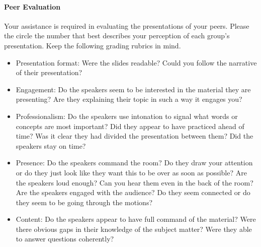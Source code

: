 \documentclass[10pt]{article}
\begin{document}

\newcommand{\grademe}[2]{
\begin{table}[h!]
	\centering
	\begin{tabular}{|l|c|c|c|c|c|p{2.5in}|}
	\hline
	Criteria & Poor & Fair & Average & Good & Excellent & Comments \\
	\hline
	Presentation format 		& 1 & 2 & 3 & 4 & 5 & \\[1.5ex]
	Engagement	& 1 & 2 & 3 & 4 & 5 & \\[1.5ex]
	Professionalism	& 1 & 2 & 3 & 4 & 5 & \\[1.5ex]
	Presence 	& 1 & 2 & 3 & 4 & 5 & \\[1.5ex]
	Content 		& 1 & 2 & 3 & 4 & 5 & \\[1.5ex]
	\hline
	\end{tabular}
	\caption{Group #1 - #2}
\end{table}
}


\paragraph{Peer Evaluation}

Your assistance is required in evaluating the presentations of your peers. Please the circle the number that best describes your perception of each group's presentation. Keep the following grading rubrics in mind. 

\begin{itemize}
	\item Presentation format: Were the slides readable? Could you follow the narrative of their presentation?
	\item Engagement: Do the speakers seem to be interested in the material they are presenting? Are they explaining their topic in such a way it engages you?
	\item Professionalism: Do the speakers use intonation to signal what words or concepts are most important? Did they appear to have practiced ahead of time? Was it clear they had divided the presentation between them? Did the speakers stay on time? 
	\item Presence: Do the speakers command the room? Do they draw your attention or do they just look like they want this to be over as soon as possible? Are the speakers loud enough? Can you hear them even in the back of the room?  Are the speakers engaged with the audience? Do they seem connected or do they seem to be going through the motions?	
	\item Content: Do the speakers appear to have full command of the material? Were there obvious gaps in their knowledge of the subject matter? Were they able to answer questions coherently? 
\end{itemize}
\end{document}
